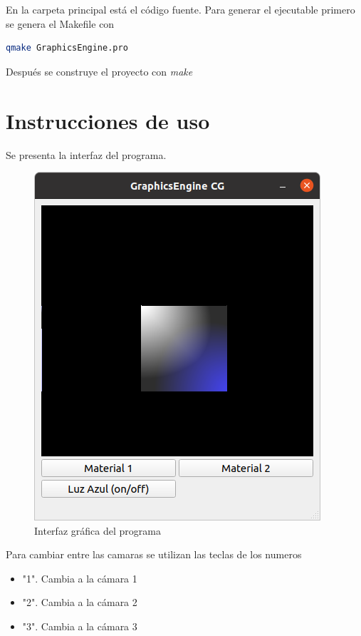 \documentclass[12pt]{article}
\begin{document}
En la carpeta principal está el código fuente. Para generar el ejecutable primero se genera el Makefile con

\begin{lstlisting}[language=bash,title={bash}]
 qmake GraphicsEngine.pro
\end{lstlisting}

Después se construye el proyecto con \textit{make}



\section{Instrucciones de uso}
Se presenta la interfaz del programa.

\begin{figure}[H]
\centering
\includegraphics[scale=0.5]{images/ej1.png}
\caption{Interfaz gráfica del programa}
\end{figure}

Para cambiar entre las camaras se utilizan las teclas de los numeros
\begin{itemize}
\item "1". Cambia a la cámara 1
\item "2". Cambia a la cámara 2
\item "3". Cambia a la cámara 3

\end{itemize}
\end{document}
